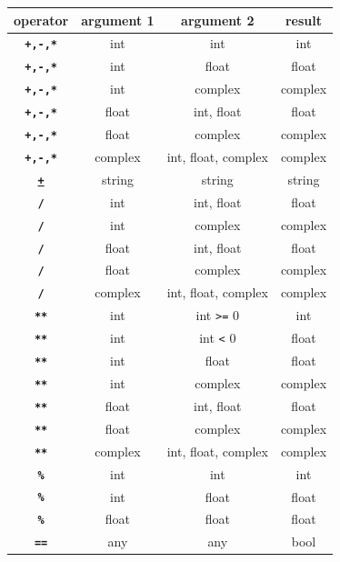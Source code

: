 \begin{center}
  \begin{tabular}{c|c|c|c}
    operator & argument 1 & argument 2 & result\\ \hline
    \texttt{\textbf{+,-,*}} & int       & int       & int\\
    \texttt{\textbf{+,-,*}} & int       & float     & float\\
    \texttt{\textbf{+,-,*}} & int       & complex   & complex\\
    \texttt{\textbf{+,-,*}} & float     & int, float      & float\\
    \texttt{\textbf{+,-,*}} & float     & complex   & complex\\
    \texttt{\textbf{+,-,*}} & complex   & int, float, complex      & complex\\
    \texttt{\href{https://sourceacademy.org/sicpy/3.3.4\#p24}{\textbf{+}}}
    & string   & string     & string\\
    \texttt{\textbf{/}} & int       & int, float      & float\\
    \texttt{\textbf{/}} & int       & complex   & complex\\
    \texttt{\textbf{/}} & float     & int, float      & float\\
    \texttt{\textbf{/}} & float     & complex   & complex\\
    \texttt{\textbf{/}} & complex   & int, float, complex       & complex\\
    \texttt{\textbf{**}} & int   & int \verb|>=| 0   & int\\
    \texttt{\textbf{**}} & int   & int \verb|<| 0    & float\\
    \texttt{\textbf{**}} & int       & float     & float\\
    \texttt{\textbf{**}} & int       & complex   & complex\\
    \texttt{\textbf{**}} & float     & int, float      & float\\
    \texttt{\textbf{**}} & float     & complex   & complex\\
    \texttt{\textbf{**}} & complex   & int, float, complex     & complex\\
    \texttt{\textbf{\%}} & int   & int   & int\\
    \texttt{\textbf{\%}} & int   & float   & float\\
    \texttt{\textbf{\%}} & float   & float   & float\\
    \texttt{\textbf{==}} & any   & any     & bool\\

\end{tabular}
\end{center}

